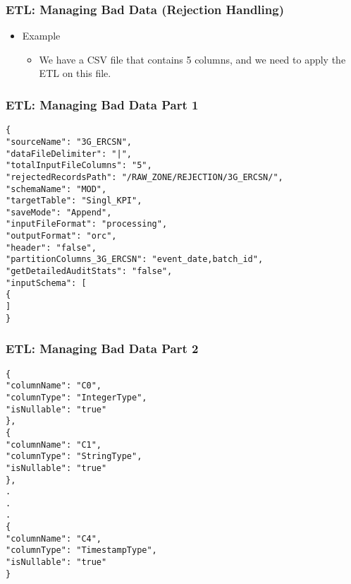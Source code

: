 \begin{frame}[fragile]
	\frametitle{ETL: Managing Bad Data (Rejection Handling)}

	\begin{itemize}[<+->]
		\item Example
		\begin{itemize}[<+->]
			\item  We have a CSV file that contains 5 columns, and we need to apply the ETL on this file.
		\end{itemize}
	\end{itemize}



\end{frame}
\begin{frame}[fragile]
	\frametitle{ETL: Managing Bad Data Part 1}

\begin{lstlisting}[style=json]
{
"sourceName": "3G_ERCSN",
"dataFileDelimiter": "|",
"totalInputFileColumns": "5",
"rejectedRecordsPath": "/RAW_ZONE/REJECTION/3G_ERCSN/",
"schemaName": "MOD",
"targetTable": "Singl_KPI",
"saveMode": "Append",
"inputFileFormat": "processing",
"outputFormat": "orc",
"header": "false",
"partitionColumns_3G_ERCSN": "event_date,batch_id",
"getDetailedAuditStats": "false",
"inputSchema": [
{
]
}
	\end{lstlisting}

\end{frame}
\begin{frame}[fragile]
	\frametitle{ETL: Managing Bad Data Part 2}

\begin{lstlisting}[style=json,basicstyle=\scriptsize ]
{
"columnName": "C0",
"columnType": "IntegerType",
"isNullable": "true"
},
{
"columnName": "C1",
"columnType": "StringType",
"isNullable": "true"
},
.
.
.
{
"columnName": "C4",
"columnType": "TimestampType",
"isNullable": "true"
}
\end{lstlisting}

\end{frame}

